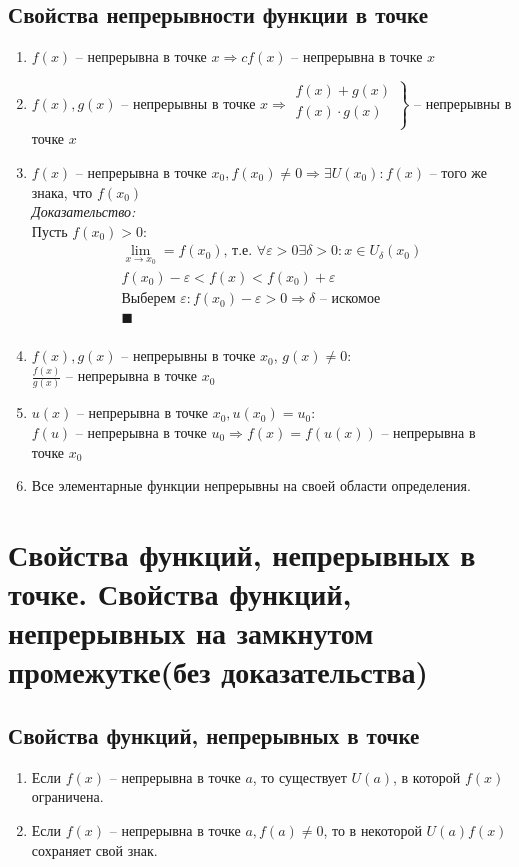 \documentclass[12pt, fleqn]{article}
\begin{document}
\subsection{Свойства непрерывности функции в точке}
\begin{enumerate}
	\item $f(x)$ -- непрерывна в точке $x \Rightarrow cf(x)$ -- непрерывна в точке $x$
	\item $f(x), g(x)$ -- непрерывны в точке $x \Rightarrow \left. \begin{gathered}
		f(x)+ g(x)\\
		f(x)\cdot g(x)\\
	\end{gathered}\right\}$ -- непрерывны в точке $x$
	\item $f(x)$ -- непрерывна в точке $x_0, f(x_0)\neq 0 \Rightarrow \exists U(x_0)\colon f(x)$ -- того же знака, что $f(x_0)$\\
	\textit{Доказательство:}\\
	Пусть $f(x_0) > 0$:
	\begin{multline*}
		\lim_{x\to x_0} = f(x_0) \text{, т.е. } \forall \varepsilon > 0 \exists \delta>0\colon x\in U_\delta(x_0)\\
		f(x_0) - \varepsilon < f(x) < f(x_0)+\varepsilon\\
		\text{Выберем } \varepsilon\colon f(x_0)-\varepsilon > 0 \Rightarrow \delta \text{ -- искомое}\\
		\blacksquare\\
	\end{multline*}
	\item $f(x), g(x)$ -- непрерывны в точке $x_0$, $g(x)\neq 0\colon$\\
	$\frac{f(x)}{g(x)}$ -- непрерывна в точке $x_0$
	\item $u(x)$ -- непрерывна в точке $x_0, u(x_0)=u_0\colon$\\
	$f(u)$ -- непрерывна в точке $u_0 \Rightarrow f(x)=f(u(x))$ -- непрерывна в точке $x_0$
	\item Все элементарные функции непрерывны на своей области определения.
\end{enumerate}
\section{Свойства функций, непрерывных в точке. Свойства функций, непрерывных на замкнутом промежутке(без доказательства)}
\subsection{Свойства функций, непрерывных в точке}
\begin{enumerate}
	\item Если $f(x)$ -- непрерывна в точке $a$, то существует $U(a)$, в которой $f(x)$ ограничена.
	\item Если $f(x)$ -- непрерывна в точке $a, f(a)\neq 0$, то в некоторой $U(a) f(x)$ сохраняет свой знак.
\end{enumerate}
\end{document}
